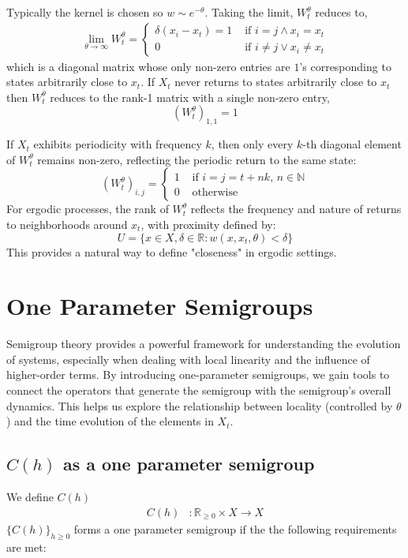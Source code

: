 \documentclass{article}
\newcommand{\N}{\mathbb{N}}
\newcommand{\R}{\mathbb{R}}
\begin{document}
Typically the kernel is chosen so $w \sim e^{-\theta}$. 
Taking the limit, $W_t^\theta$ reduces to,
\begin{align*}
    \lim_{\theta\rightarrow\infty} W_t^\theta = 
    \begin{cases} 
      \delta(x_i - x_t) = 1 &\text{ if }i=j \wedge x_i = x_t\\
      0 &\text{ if } i\neq j \vee x_i \neq x_t
   \end{cases}
\end{align*}
which is a diagonal matrix whose only non-zero entries are $1$'s corresponding to states arbitrarily close to $x_t$. If $X_t$ never returns to states arbitrarily close to $x_t$ then $W_t^\theta$ reduces to the rank-1 matrix with a single non-zero entry, 
$$
    (W_t^\theta)_{1,1} = 1
$$

If \( X_t \) exhibits periodicity with frequency \( k \), then only every \( k \)-th diagonal element of \( W_t^\theta \) remains non-zero, reflecting the periodic return to the same state:
$$
    (W_t^\theta)_{i,j} = 
    \begin{cases}
        1  &\text{ if } i=j=t+nk,\, n\in\N\\
        0  &\text{ otherwise}
    \end{cases}
$$
For ergodic processes, the rank of \( W_t^\theta \) reflects the frequency and nature of returns to neighborhoods around \( x_t \), with proximity defined by:
$$
    U = \{x \in X, \delta \in \mathbb{R}: w(x, x_t, \theta) < \delta\}
$$
This provides a natural way to define "closeness" in ergodic settings.

\section{One Parameter Semigroups}
Semigroup theory provides a powerful framework for understanding the evolution of systems, especially when dealing with local linearity and the influence of higher-order terms. By introducing one-parameter semigroups, we gain tools to connect the operators that generate the semigroup with the semigroup's overall dynamics. This helps us explore the relationship between locality (controlled by \( \theta \)) and the time evolution of the elements in \( X_t \).


\subsection{$C(h)$ as a one parameter semigroup}

We define $C(h)$
\begin{align*}
    C(h)&: \R_{\geq0} \times X \rightarrow X \nonumber
\end{align*}
$\{C(h)\}_{h\geq 0}$ forms a one parameter semigroup if the the following requirements are met:
\end{document}
